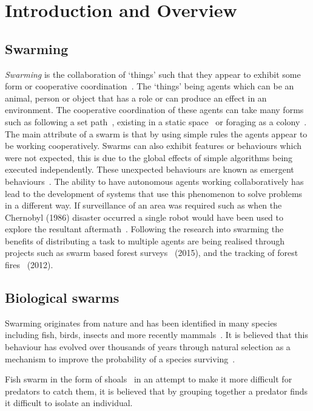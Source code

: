 \chapter{Introduction and Overview}\label{introduction}
\section{Swarming}
\emph{Swarming} is the collaboration of `things' such that they appear to exhibit some form or cooperative coordination~\cite{BS:13, BAFVM:06, BAF:06, BFV:07}. The `things' being agents which can be an animal, person or object that has a role or can produce an effect in an environment. The cooperative coordination of these agents can take many forms such as following a set path~\cite{HCS:09}, existing in a static space~\cite{EP:10, GP:02, GP:04} or foraging as a colony~\cite{HER:11, GK:07}. The main attribute of a swarm is that by using simple rules the agents appear to be working cooperatively. 
Swarms can also exhibit features or behaviours which were not expected, this is due to the global effects of simple algorithms being executed independently. These unexpected behaviours are known as emergent behaviours~\cite{RM:11, RMT:15}.
The ability to have autonomous agents working collaboratively has lead to the development of systems that use this phenomenon to solve problems in a different way. If surveillance of an area was required such as when the Chernobyl (1986) disaster occurred a single robot would have been used to explore the resultant aftermath~\cite{JA:98}. Following the research into swarming the benefits of distributing a task to multiple agents are being realised through projects such as swarm based forest surveys~\cite{BSB:15} (2015), and the tracking of forest fires~\cite{SOM:12} (2012).

\section{Biological swarms}
Swarming originates from nature and has been identified in many species including fish, birds, insects and more recently mammals~\cite{SFDCIC:15}. It is believed that this behaviour has evolved over thousands of years through natural selection as a mechanism to improve the probability of a species surviving~\cite{CZ:07}.

Fish swarm in the form of shoals~\cite{PMRT:14} in an attempt to make it more difficult for predators to catch them, it is believed that by grouping together a predator finds it difficult to isolate an individual.

